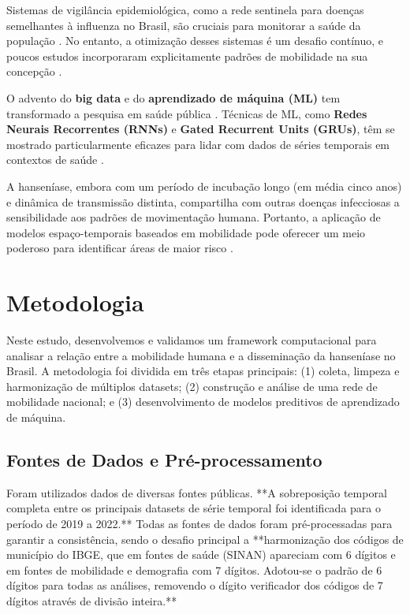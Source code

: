 \documentclass[preprint,12pt]{elsarticle}
\begin{document}
Sistemas de vigilância epidemiológica, como a rede sentinela para doenças semelhantes à influenza no Brasil, são cruciais para monitorar a saúde da população \cite{oliveira2024findings, oliveira2024ranking}. No entanto, a otimização desses sistemas é um desafio contínuo, e poucos estudos incorporaram explicitamente padrões de mobilidade na sua concepção \cite{oliveira2024genetic, oliveira2024improvements}.

O advento do \textbf{big data} e do \textbf{aprendizado de máquina (ML)} tem transformado a pesquisa em saúde pública \cite{inovacao2024computacional, mooney2018big, saldanha2021resumo, saldanha2021inovacao}. Técnicas de ML, como \textbf{Redes Neurais Recorrentes (RNNs)} e \textbf{Gated Recurrent Units (GRUs)}, têm se mostrado particularmente eficazes para lidar com dados de séries temporais em contextos de saúde \cite{inovacao2024modelagem, shahidi2024exploring, shahidi2024conclusion, morid2023time, silva2022machine, madden2024deep}.

A hanseníase, embora com um período de incubação longo (em média cinco anos) \cite{bacilo2022principal, scollard2016pathogenesis} e dinâmica de transmissão distinta, compartilha com outras doenças infecciosas a sensibilidade aos padrões de movimentação humana. Portanto, a aplicação de modelos espaço-temporais baseados em mobilidade pode oferecer um meio poderoso para identificar áreas de maior risco \cite{inovacao2024analise}.

\section{Metodologia}

Neste estudo, desenvolvemos e validamos um framework computacional para analisar a relação entre a mobilidade humana e a disseminação da hanseníase no Brasil. A metodologia foi dividida em três etapas principais: (1) coleta, limpeza e harmonização de múltiplos datasets; (2) construção e análise de uma rede de mobilidade nacional; e (3) desenvolvimento de modelos preditivos de aprendizado de máquina.

\subsection{Fontes de Dados e Pré-processamento}
Foram utilizados dados de diversas fontes públicas. **A sobreposição temporal completa entre os principais datasets de série temporal foi identificada para o período de 2019 a 2022.** Todas as fontes de dados foram pré-processadas para garantir a consistência, sendo o desafio principal a **harmonização dos códigos de município do IBGE, que em fontes de saúde (SINAN) apareciam com 6 dígitos e em fontes de mobilidade e demografia com 7 dígitos. Adotou-se o padrão de 6 dígitos para todas as análises, removendo o dígito verificador dos códigos de 7 dígitos através de divisão inteira.**
\end{document}
